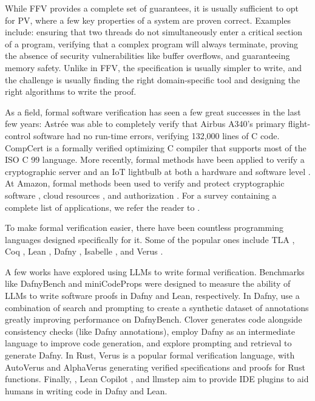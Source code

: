 While FFV provides a complete set of guarantees, it is usually sufficient to opt for PV, where a few key properties of a system are proven correct. Examples include: ensuring that two threads do not simultaneously enter a critical section of a program, verifying that a complex program will always terminate, proving the absence of security vulnerabilities like buffer overflows, and guaranteeing memory safety. Unlike in FFV, the specification is usually simpler to write, and the challenge is usually finding the right domain-specific tool and designing the right algorithms to write the proof.

As a field, formal software verification has seen a few great successes in the last few years: Astrée \citep{cousot2005astree} was able to completely verify that Airbus A340's primary flight-control software had no run-time errors, verifying 132,000 lines of C code. 
CompCert \citep{leroy2016compcert} is a formally verified optimizing C compiler that supports most of the ISO C 99 language. More recently, formal methods have been applied to verify a cryptographic server \citep{erbsen2024foundational} and an IoT lightbulb at both a hardware and software level \citep{erbsen2021integration}. At Amazon, formal methods been used to verify and protect cryptographic software \citep{goel2024leanprover}, cloud resources \citep{xu2024cloud}, and authorization \citep{disselkoen2025cedar}. For a survey containing a complete list of applications, we refer the reader to \citet{huang2023lessons}.

To make formal verification easier, there have been countless programming languages designed specifically for it. Some of the popular ones include TLA \citep{lamport1994introduction}, Coq \citep{Coq-refman}, Lean \citep{de2015lean}, Dafny \citep{leino2010dafny}, Isabelle \citep{nipkow2002isabelle}, and Verus \citep{lattuada2024verus}. 

A few works have explored using LLMs to write formal verification. Benchmarks like DafnyBench \citep{loughridge2024dafnybench} and miniCodeProps \citep{lohn2024minicodeprops} were designed to measure the ability of LLMs to write software proofs in Dafny and Lean, respectively. In Dafny, \citet{poesia2024dafny} use a combination of search and prompting to create a synthetic dataset of annotations greatly improving performance on DafnyBench. Clover \citep{sun2024clover} generates code alongside consistency checks (like Dafny annotations), \citet{li2025dafny} employ Dafny as an intermediate language to improve code generation, and \citet{misu2024towards} explore prompting and retrieval to generate Dafny. In Rust, Verus is a popular formal verification language, with AutoVerus \citep{yang2024autoverus} and AlphaVerus \citep{aggarwal2024alphaverus} generating verified specifications and proofs for Rust functions. Finally, \citet{silva2024leveraging}, Lean Copilot \citep{song2024towards}, and llmstep \citep{welleck2023llmstep} aim to provide IDE plugins to aid humans in writing code in Dafny and Lean.

